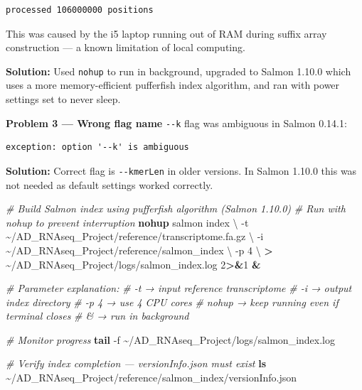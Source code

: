 \documentclass[
]{article}
\newenvironment{Shaded}{\begin{snugshade}}{\end{snugshade}}
\newcommand{\AttributeTok}[1]{\textcolor[rgb]{0.13,0.29,0.53}{#1}}
\newcommand{\CommentTok}[1]{\textcolor[rgb]{0.56,0.35,0.01}{\textit{#1}}}
\newcommand{\DataTypeTok}[1]{\textcolor[rgb]{0.13,0.29,0.53}{#1}}
\newcommand{\DecValTok}[1]{\textcolor[rgb]{0.00,0.00,0.81}{#1}}
\newcommand{\FunctionTok}[1]{\textcolor[rgb]{0.13,0.29,0.53}{\textbf{#1}}}
\newcommand{\KeywordTok}[1]{\textcolor[rgb]{0.13,0.29,0.53}{\textbf{#1}}}
\newcommand{\NormalTok}[1]{#1}
\newcommand{\OperatorTok}[1]{\textcolor[rgb]{0.81,0.36,0.00}{\textbf{#1}}}
\begin{document}
\begin{verbatim}
processed 106000000 positions
\end{verbatim}

This was caused by the i5 laptop running out of RAM during suffix array
construction --- a known limitation of local computing.

\textbf{Solution:} Used \texttt{nohup} to run in background, upgraded to
Salmon 1.10.0 which uses a more memory-efficient pufferfish index
algorithm, and ran with power settings set to never sleep.

\textbf{Problem 3 --- Wrong flag name} \texttt{-\/-k} flag was ambiguous
in Salmon 0.14.1:

\begin{verbatim}
exception: option '--k' is ambiguous
\end{verbatim}

\textbf{Solution:} Correct flag is \texttt{-\/-kmerLen} in older
versions. In Salmon 1.10.0 this was not needed as default settings
worked correctly.

\begin{Shaded}
\begin{Highlighting}[]
\CommentTok{\# Build Salmon index using pufferfish algorithm (Salmon 1.10.0)}
\CommentTok{\# Run with nohup to prevent interruption}
\FunctionTok{nohup}\NormalTok{ salmon index }\DataTypeTok{\textbackslash{}}
    \AttributeTok{{-}t}\NormalTok{ \textasciitilde{}/AD\_RNAseq\_Project/reference/transcriptome.fa.gz }\DataTypeTok{\textbackslash{}}
    \AttributeTok{{-}i}\NormalTok{ \textasciitilde{}/AD\_RNAseq\_Project/reference/salmon\_index }\DataTypeTok{\textbackslash{}}
    \AttributeTok{{-}p}\NormalTok{ 4 }\DataTypeTok{\textbackslash{}}
    \OperatorTok{\textgreater{}}\NormalTok{ \textasciitilde{}/AD\_RNAseq\_Project/logs/salmon\_index.log }\DecValTok{2}\OperatorTok{\textgreater{}\&}\DecValTok{1} \KeywordTok{\&}

\CommentTok{\# Parameter explanation:}
\CommentTok{\# {-}t     → input reference transcriptome}
\CommentTok{\# {-}i     → output index directory}
\CommentTok{\# {-}p 4   → use 4 CPU cores}
\CommentTok{\# nohup  → keep running even if terminal closes}
\CommentTok{\# \&      → run in background}

\CommentTok{\# Monitor progress}
\FunctionTok{tail} \AttributeTok{{-}f}\NormalTok{ \textasciitilde{}/AD\_RNAseq\_Project/logs/salmon\_index.log}

\CommentTok{\# Verify index completion — versionInfo.json must exist}
\FunctionTok{ls}\NormalTok{ \textasciitilde{}/AD\_RNAseq\_Project/reference/salmon\_index/versionInfo.json}
\end{Highlighting}
\end{Shaded}
\end{document}
